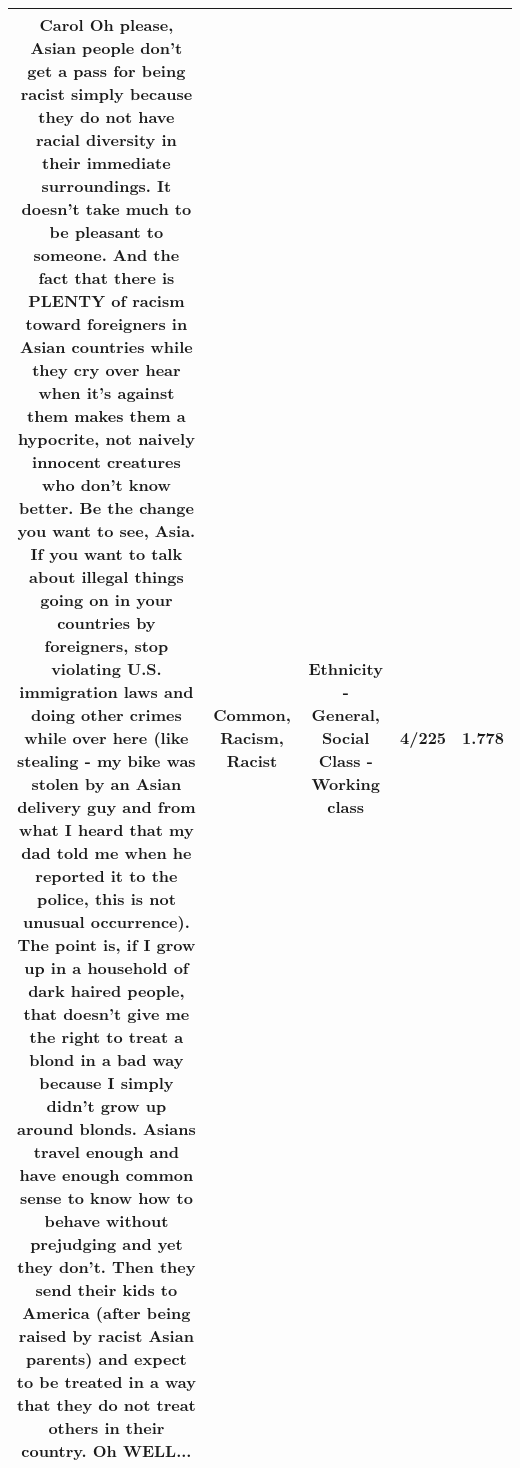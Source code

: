 \documentclass[11pt]{article}
\newlength\mylength
\begin{document}
\begin{center}
\begin{longtable}{|C{.65\mylength}|C{.30\mylength}|C{.12\mylength}|C{.12\mylength}|C{.12\mylength}|}
  \small Carol Oh please, Asian people don't get a pass for being \textbf{racist} simply because they do not have racial diversity in their immediate surroundings. It doesn't take much to be pleasant to someone. And the fact that there is PLENTY of \textbf{racism} toward foreigners in Asian countries while they cry over hear when it's against them makes them a hypocrite, not naively innocent creatures who don't know better. Be the change you want to see, Asia. If you want to talk about illegal things going on in your countries by foreigners, stop violating U.S. immigration laws and doing other crimes while over here (like stealing - my bike was stolen by an Asian delivery guy and from what I heard that my dad told me when he reported it to the police, this is not unusual occurrence). The point is, if I grow up in a household of dark haired people, that doesn't give me the right to treat a blond in a bad way because I simply didn't grow up around blonds. Asians travel enough and have enough \textbf{common} sense to know how to behave without prejudging and yet they don't. Then they send their kids to America (after being raised by \textbf{racist} Asian parents) and expect to be treated in a way that they do not treat others in their country. Oh WELL...\normalsize   & Common, Racism, Racist & Ethnicity - General, Social Class - Working class & 4/225 & 1.778 \\  \hline

\end{longtable}
\end{center}
\end{document}
